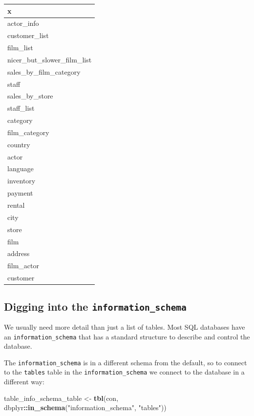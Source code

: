 \documentclass[]{book}
\newenvironment{Shaded}{\begin{snugshade}}{\end{snugshade}}
\newcommand{\KeywordTok}[1]{\textcolor[rgb]{0.13,0.29,0.53}{\textbf{#1}}}
\newcommand{\NormalTok}[1]{#1}
\newcommand{\OperatorTok}[1]{\textcolor[rgb]{0.81,0.36,0.00}{\textbf{#1}}}
\newcommand{\StringTok}[1]{\textcolor[rgb]{0.31,0.60,0.02}{#1}}
\theoremstyle{definition}
\theoremstyle{definition}
\theoremstyle{definition}
\theoremstyle{remark}
\begin{document}
\begin{tabular}{l}
\hline
x\\
\hline
actor\_info\\
\hline
customer\_list\\
\hline
film\_list\\
\hline
nicer\_but\_slower\_film\_list\\
\hline
sales\_by\_film\_category\\
\hline
staff\\
\hline
sales\_by\_store\\
\hline
staff\_list\\
\hline
category\\
\hline
film\_category\\
\hline
country\\
\hline
actor\\
\hline
language\\
\hline
inventory\\
\hline
payment\\
\hline
rental\\
\hline
city\\
\hline
store\\
\hline
film\\
\hline
address\\
\hline
film\_actor\\
\hline
customer\\
\hline
\end{tabular}

\hypertarget{digging-into-the-information_schema}{%
\subsection{\texorpdfstring{Digging into the
\texttt{information\_schema}}{Digging into the information\_schema}}\label{digging-into-the-information_schema}}

We usually need more detail than just a list of tables. Most SQL
databases have an \texttt{information\_schema} that has a standard
structure to describe and control the database.

The \texttt{information\_schema} is in a different schema from the
default, so to connect to the \texttt{tables} table in the
\texttt{information\_schema} we connect to the database in a different
way:

\begin{Shaded}
\begin{Highlighting}[]
\NormalTok{table_info_schema_table <-}\StringTok{ }\KeywordTok{tbl}\NormalTok{(con, dbplyr}\OperatorTok{::}\KeywordTok{in_schema}\NormalTok{(}\StringTok{"information_schema"}\NormalTok{, }\StringTok{"tables"}\NormalTok{))}
\end{Highlighting}
\end{Shaded}
\end{document}
